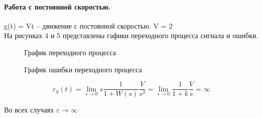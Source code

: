 \documentclass[a4paper, 11pt]{article}
\begin{document}
\paragraph{Работа с постоянной скоростью.} g(t) = Vt – движение с постоянной скоростью. V = 2\\На рисунках 4 и 5 представлены гафики переходного процесса сигнала и ошибки.


\begin{figure}[h!]
    \caption{График переходного процесса}
    \label{four}
\end{figure}

\newpage

\begin{figure}[h!]
    \caption{График ошибки переходного процесса}
    \label{tree}
\end{figure}

\begin{equation}
	\varepsilon_y(t)=\lim_{s\to0}s\frac{1}{1+W(s)}\frac{V}{s^2}=\lim_{s\to0}\frac{1}{1+k}\frac{V}{s}=\infty
\end{equation}

Во всех случаях $\varepsilon\to\infty$ \\
\end{document}
